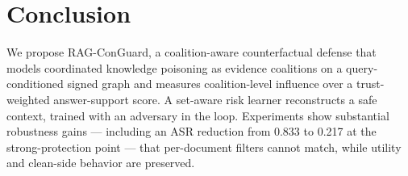 \documentclass[sigconf]{acmart}
\begin{document}
\section{Conclusion}

We propose RAG-ConGuard, a coalition-aware counterfactual defense that models coordinated knowledge poisoning as evidence coalitions on a query-conditioned signed graph and measures coalition-level influence over a trust-weighted answer-support score. A set-aware risk learner reconstructs a safe context, trained with an adversary in the loop. Experiments show substantial robustness gains --- including an ASR reduction from 0.833 to 0.217 at the strong-protection point --- that per-document filters cannot match, while utility and clean-side behavior are preserved.




\end{document}
